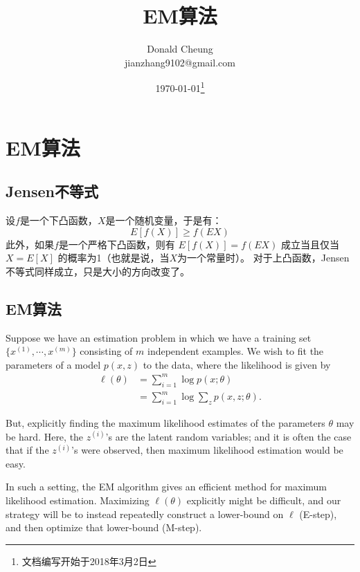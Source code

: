 \ifx\mlnotes\undefined
    \providecommand{\notesroot}{../..}
    \providecommand{\emroot}{.}

    \title{EM算法}
    \author{Donald Cheung\\jianzhang9102@gmail.com}
    \date{\today\footnote{文档编写开始于2018年3月2日}}

    
\else
    \providecommand{\emroot}{\mlroot/em}
\fi

\chapter{EM算法}

\section{Jensen不等式}

\begin{thm}
设$f$是一个下凸函数，$X$是一个随机变量，于是有：
\[
    E[f(X)] \ge f(EX)
\]
此外，如果$f$是一个严格下凸函数，则有 $E[f(X)] = f(EX)$ 成立当且仅当 $X=E[X]$ 的概率为1（也就是说，当$X$为一个常量时）。
对于上凸函数，Jensen不等式同样成立，只是大小的方向改变了。
\end{thm}


\section{EM算法}
    Suppose we have an estimation problem in which we have a training set $\{x^{(1)}, \cdots, x^{(m)}\}$ consisting of $m$ independent examples.
We wish to fit the parameters of a model $p(x, z)$ to the data, where the likelihood is given by
\begin{align*}
    \ell (\theta) &= \sum\limits_{i=1}^{m}{\log p(x;\theta)} \\
                  &= \sum\limits_{i=1}^{m}{\log \sum\limits_{z}{p(x,z; \theta)}}.
\end{align*}

    But, explicitly finding the maximum likelihood estimates of the parameters $\theta$ may be hard.
Here, the $z^{(i)}$'s are the latent random variables;
and it is often the case that if the $z^{(i)}$'s were observed, then maximum likelihood estimation would be easy.

    In such a setting, the EM algorithm gives an efficient method for maximum likelihood estimation.
Maximizing $\ell (\theta)$ explicitly might be difficult, and our strategy will be to instead
repeatedly construct a lower-bound on $\ell$ (E-step), and then optimize that lower-bound (M-step).

